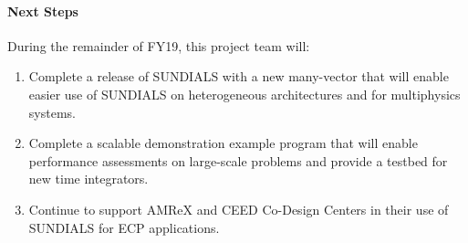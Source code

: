 \paragraph{Next Steps}

During the remainder of FY19, this project team will:
\begin{enumerate}
\item Complete a release of SUNDIALS with a new many-vector that will enable easier use of SUNDIALS on heterogeneous architectures and for multiphysics systems.
\item Complete a scalable demonstration example program that will enable performance assessments on large-scale problems and provide a testbed for new time integrators.
\item Continue to support AMReX and CEED Co-Design Centers in their use of SUNDIALS for ECP applications.
\end{enumerate}
